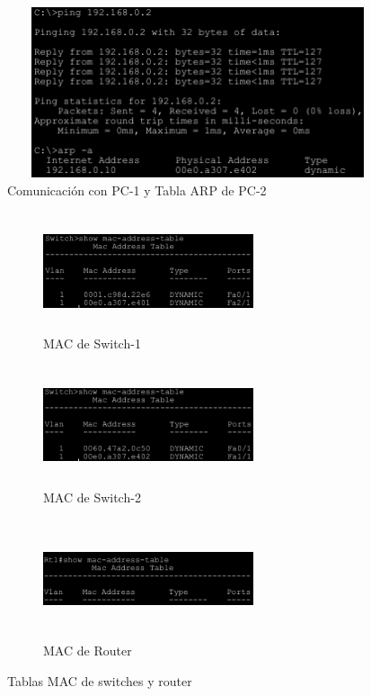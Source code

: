 {\begin{itemize}
\begin{figure}[ht]
                \includegraphics[width=12cm, height=5cm]{imagenes/captura13.png}
                \caption{Comunicaci\'on con PC-1 y Tabla ARP de PC-2}
            \end{figure}
            \newpage

            \begin{figure}[ht]
                \centering
                \begin{subfigure}[b]{0.4 \linewidth}
                    \includegraphics[width=6.2cm, height=3.5cm]{imagenes/captura14.png}
                    \caption{MAC de Switch-1}
                \end{subfigure}
                \begin{subfigure}[b]{0.4 \linewidth}
                    \includegraphics[width=6.2cm, height=3.5cm]{imagenes/captura15.png}
                    \caption{MAC de Switch-2}
                \end{subfigure}
                \begin{subfigure}[b]{0.4 \linewidth}
                    \includegraphics[width=6.2cm, height=3.5cm]{imagenes/captura16.png}
                    \caption{MAC de Router}
                \end{subfigure}
                \caption{Tablas MAC de switches y router}
            \end{figure}
    \end{itemize}

}
